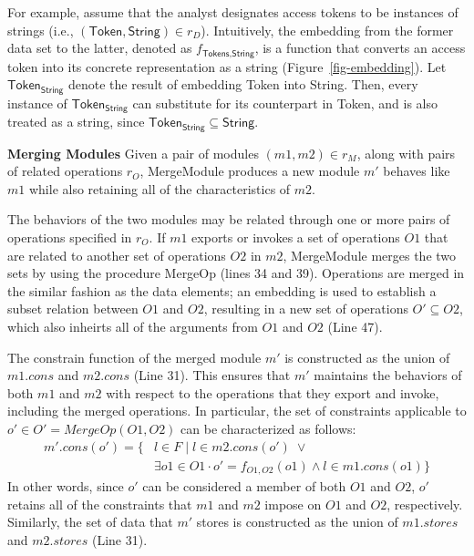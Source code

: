 For example, assume that the analyst designates access tokens to be
instances of strings (i.e., $(\textsf{Token},\textsf{String}) \in
r_{D}$). Intuitively, the embedding from the former data set to the
latter, denoted as $f_{\textsf{Tokens},\textsf{String}}$, is a
function that converts an access token into its concrete
representation as a string (Figure~\ref{fig-embedding}). Let
$\textsf{Token}_\textsf{String}$ denote the result of embedding
\textsf{Token} into \textsf{String}. Then, every instance of
$\textsf{Token}_\textsf{String}$ can substitute for its counterpart in
\textsf{Token}, and is also treated as a string, since
$\textsf{Token}_\textsf{String} \subseteq \textsf{String}$.

\textbf{Merging Modules} Given a pair of modules $(m1, m2) \in r_{M}$,
along with pairs of related operations $r_{O}$, \textsf{MergeModule}
produces a new module $m'$ behaves like $m1$ while also retaining all
of the characteristics of $m2$. 

The behaviors of the two modules may be related through one or more
pairs of operations specified in $r_{O}$. If $m1$ exports or invokes
a set of operations $O1$ that are related to another set of operations
$O2$ in $m2$, \textsf{MergeModule} merges the two sets by using the
procedure \textsf{MergeOp} (lines 34 and 39). Operations are
merged in the similar fashion as the data elements; an embedding is
used to establish a subset relation between $O1$ and $O2$, resulting
in a new set of operations $O' \subseteq O2$, which also inheirts all
of the arguments from $O1$ and $O2$ (Line 47).

The constrain function of the merged module $m'$ is constructed
as the union of $m1.cons$ and $m2.cons$ (Line 31). This ensures that $m'$
maintains the behaviors of both $m1$ and $m2$ with respect to the
operations that they export and invoke, including the merged
operations. In particular, the set of constraints applicable to $o' \in O' =
MergeOp(O1, O2)$ can be characterized as follows:
\begin{align*}
m'.cons(o') = \{& l \in F \;|\; l \in m2.cons(o') \; \lor \\
&\exists o1 \in O1 
\cdot o' = f_{O1, O2}(o1) \land l \in m1.cons(o1) \} 
\end{align*}
In other words, since $o'$ can be considered a member of both $O1$ and
$O2$, $o'$ retains all of the constraints that $m1$ and $m2$ impose
on $O1$ and $O2$, respectively. Similarly, the set of data that $m'$
stores is constructed as the union of $m1.stores$ and $m2.stores$ (Line 31).

